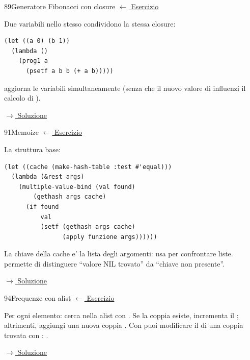 \label{hint:89}
\begin{hintbox}{89}{Generatore Fibonacci con closure}
\small\color{black!55}\hyperref[ex:89]{$\leftarrow$ Esercizio}\normalsize\color{black}

Due variabili nello stesso  condividono la stessa closure:
\begin{lstlisting}
(let ((a 0) (b 1))
  (lambda ()
    (prog1 a
      (psetf a b b (+ a b)))))
\end{lstlisting}
 aggiorna le variabili simultaneamente (senza
che il nuovo valore di  influenzi il calcolo di ).

\small\color{black!55}\hyperref[sol:89]{$\rightarrow$ Soluzione}\normalsize\color{black}
\end{hintbox}

\label{hint:91}
\begin{hintbox}{91}{Memoize}
\small\color{black!55}\hyperref[ex:91]{$\leftarrow$ Esercizio}\normalsize\color{black}

La struttura base:
\begin{lstlisting}
(let ((cache (make-hash-table :test #'equal)))
  (lambda (&rest args)
    (multiple-value-bind (val found)
        (gethash args cache)
      (if found
          val
          (setf (gethash args cache)
                (apply funzione args))))))
\end{lstlisting}
La chiave della cache e' la lista degli argomenti: usa
 per confrontare liste.
 permette di distinguere ``valore NIL
trovato'' da ``chiave non presente''.

\small\color{black!55}\hyperref[sol:91]{$\rightarrow$ Soluzione}\normalsize\color{black}
\end{hintbox}


\label{hint:94}
\begin{hintbox}{94}{Frequenze con alist}
\small\color{black!55}\hyperref[ex:94]{$\leftarrow$ Esercizio}\normalsize\color{black}

Per ogni elemento: cerca nella alist con .
Se la coppia esiste, incrementa il ; altrimenti,
aggiungi una nuova coppia .
Con  puoi modificare il  di una coppia
trovata con : .

\small\color{black!55}\hyperref[sol:94]{$\rightarrow$ Soluzione}\normalsize\color{black}
\end{hintbox}

